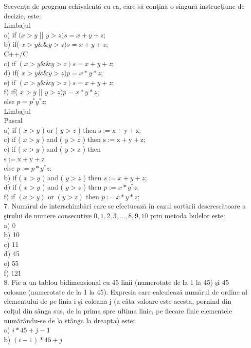 \documentclass[10pt]{article}
\begin{document}
Secvenţa de program echivalentă cu ea, care să conţină o singură instrucţiune de decizie, este:\\
Limbajul\\
a) if $(x>y$ || $y>z) s=x+y+z$;\\
b) if( $x>y \& \& y>z) s=x+y+z$;\\
C++/C\\
c) if $(x>y \& \& y>z) s=x+y+z$;\\
d) if( $x>y \& \& y>z) p=x * y * z$;\\
e) if $(x>y \& \& y>z) s=x+y+z$;\\
f) if( $x>y$ || $y>z) p=x * y * z$;\\
else $p=p^{*} y^{*} z$;\\
Limbajul\\
Pascal\\
a) if ( $x>y$ ) or ( $y>z$ ) then $\mathrm{s}:=\mathrm{x}+\mathrm{y}+\mathrm{z}$;\\
c) if ( $x>y$ ) and ( $y>z$ ) then $\mathrm{s}:=\mathrm{x}+\mathrm{y}+\mathrm{z}$;\\
e) if ( $x>y$ ) and ( $y>z$ ) then\\
$\mathrm{s}:=\mathrm{x}+\mathrm{y}+\mathrm{z}$\\
else $p:=p * y^{*} z ;$\\
b) if ( $x>y$ ) and ( $y>z$ ) then $s:=x+y+z$;\\
d) if ( $x>y$ ) and ( $y>z$ ) then $p:=x * y^{*} z$;\\
f) if $(x>y)$ or $(y>z)$ then $p:=x * y * z$;\\
7. Numărul de interschimbări care se efectuează în cazul sortării descrescătoare a şirului de numere consecutive $0,1,2,3, \ldots, 8,9,10$ prin metoda bulelor este:\\
a) 0\\
b) 10\\
c) 11\\
d) 45\\
e) 55\\
f) 121\\
8. Fie a un tablou bidimensional cu 45 linii (numerotate de la 1 la 45) şi 45 coloane (numerotate de la 1 la 45). Expresia care calculează numărul de ordine al elementului de pe linia i şi coloana j (a câta valoare este acesta, pornind din colţul din sânga sus, de la prima spre ultima linie, pe fiecare linie elementele numărându-se de la stânga la dreapta) este:\\
a) $i * 45+j-1$\\
b) $(i-1) * 45+j$\\
\end{document}

